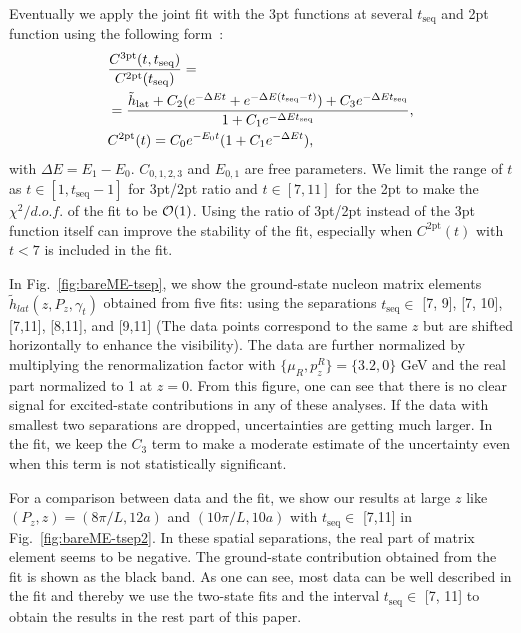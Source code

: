 Eventually we apply  the joint fit with the 3pt functions at several $t_\text{seq}$ and   2pt function using the following form~\cite{Bhattacharya:2013ehc}:
\begin{align}
&\frac{C^\text{3pt}(t,t_\text{seq})}{C^\text{2pt}(t_\text{seq})}= \nonumber\\
&=\frac{\tilde{h}_{\text{lat}}+C_2(e^{-\Delta Et}+e^{-\Delta E(t_\text{seq}-t)})+C_3e^{-\Delta E t_\text{seq}}}{1+C_1 e^{-\Delta Et_\text{seq}}},\nonumber\\
&C^\text{2pt}(t)=C_0e^{-E_0t}(1+C_1 e^{-\Delta Et}),
\end{align}
with $\Delta E= E_1-E_0$.  $C_{0,1,2,3}$ and $E_{0,1}$ are free parameters. We limit the range of $t$ as  $t\in[1,t_\text{seq}-1]$ for 3pt/2pt ratio and $t\in[7, 11]$ for the 2pt to make the $\chi^2/d.o.f.$ of the fit to be ${\cal O} (1)$.  Using the ratio of 3pt/2pt instead of the 3pt function itself can improve the stability of the fit, especially when $C^\text{2pt}(t)$ with $t<7$ is included in the fit.




In Fig.~\ref{fig:bareME-tsep}, we show the ground-state nucleon matrix elements $\tilde{h}_{lat}(z,P_z,\gamma_t)$ obtained from five fits: using the separations $t_\text{seq}\in$ [7, 9], [7, 10], [7,11], [8,11], and [9,11] (The data points correspond to the same $z$ but are shifted horizontally to enhance the visibility). The  data are further normalized by multiplying  the renormalization factor with $\{\mu_R, p_z^R\}=\{3.2, 0\}$ GeV and the real part normalized to 1 at $z=0$. From this figure, one can see that  there is no clear signal for excited-state contributions in any of these analyses.    If the data with    smallest two separations are dropped, uncertainties are getting much larger.     In the fit,  we keep the $C_3$ term to make a moderate estimate of the uncertainty even when this term is not statistically significant.


For  a comparison between data and the fit, we show our results at large $z$ like  $({P_z, z})=({8\pi/L, 12a})$ and $({10\pi/L, 10a})$ with  $t_\text{seq}\in$ [7,11] in Fig.~\ref{fig:bareME-tsep2}. In these  spatial separations,  the real part of  matrix element seems to be negative.   The ground-state contribution  obtained from the fit is shown as the black band. As one can see, most data can be well described in the fit and thereby we use the two-state fits and the interval  $t_\text{seq}\in$ [7, 11] to obtain the results   in the rest part of this paper.



